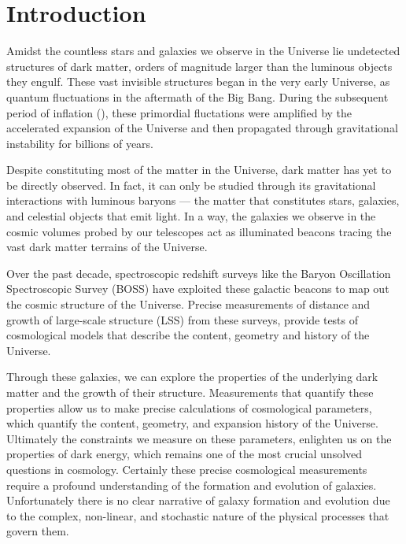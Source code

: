 \chapter*{Introduction}
Amidst the countless stars and galaxies we observe in the Universe lie 
undetected structures of dark matter, orders of magnitude larger than 
the luminous objects they engulf. These vast invisible structures began 
in the very early Universe, as quantum fluctuations in the aftermath of 
the Big Bang. 
During the subsequent period of inflation (), these primordial fluctations 
were amplified by the accelerated expansion of the Universe and then 
propagated through gravitational instability for billions of years. 

Despite constituting most of the matter in the Universe, dark matter 
has yet to be directly observed. In fact, it can only be studied through 
its gravitational interactions with luminous baryons — the matter that 
constitutes stars, galaxies, and celestial objects that emit light. 
In a way, the galaxies we observe in the cosmic volumes probed by our 
telescopes act as illuminated beacons tracing the vast dark matter 
terrains of the Universe.

Over the past decade, spectroscopic redshift surveys like the 
Baryon Oscillation Spectroscopic Survey (BOSS) have 
exploited these galactic beacons to map out the cosmic structure
of the Universe. Precise measurements of distance and growth 
of large-scale structure (LSS) from these surveys, provide tests 
of cosmological models that describe the content, geometry and history 
of the Universe. 


Through these galaxies, we can explore the properties of the underlying dark matter
and the growth of their structure. Measurements that quantify these properties allow us to make
precise calculations of cosmological parameters, which quantify the content, geometry, and
expansion history of the Universe. Ultimately the constraints we measure on these parameters,
enlighten us on the properties of dark energy, which remains one of the most crucial unsolved
questions in cosmology. Certainly these precise cosmological measurements require a profound
understanding of the formation and evolution of galaxies. Unfortunately there is no clear
narrative of galaxy formation and evolution due to the complex, non-linear, and stochastic nature
of the physical processes that govern them.

